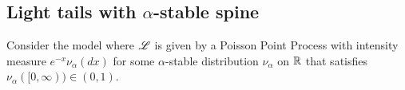 

\subsection{Light tails with $\alpha$-stable spine}
Consider the model where $\mathscr{L}$ is given by a Poisson Point Process with intensity measure $e^{-x} \nu_\alpha(dx)$ for some $\alpha$-stable distribution $\nu_\alpha$ on $\mathbb{R}$ that satisfies $\nu_\alpha([0, \infty)) \in (0, 1)$. 

\newpage
